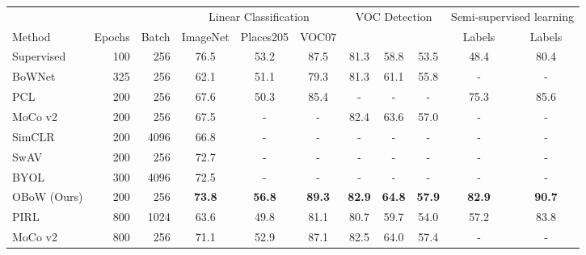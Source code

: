 \documentclass[final]{cvpr}
\begin{document}
\begin{table*}[t!]
\centering
\renewcommand{\figurename}{Table}
\renewcommand{\captionlabelfont}{\bf}
\renewcommand{\captionfont}{\small} 
{\setlength{\extrarowheight}{2pt}\small
{
\begin{tabular}{ l | r | r | c c c | c c c | c c }
\toprule
                            &    &    & \multicolumn{3}{c|}{Linear Classification} & \multicolumn{3}{c|}{VOC Detection} & \multicolumn{2}{c}{Semi-supervised learning}\\
\multicolumn{1}{l|}{Method} & Epochs & Batch & ImageNet &  Places205 & VOC07 & \multicolumn{1}{c}{} & \multicolumn{1}{c}{} & \multicolumn{1}{c|}{} & \multicolumn{1}{c}{ Labels} & \multicolumn{1}{c}{ Labels} \\
\midrule
Supervised                                                      &  100 & 256  & 76.5 & 53.2 & 87.5 & 81.3 & 58.8 & 53.5 & 48.4 & 80.4\\
\midrule
BoWNet~\cite{gidaris2020learning}                                &  325 & 256  & 62.1 & 51.1 & 79.3 & 81.3 & 61.1 & 55.8 & - & -\\
PCL~\cite{li2020prototypical}                                    &  200 & 256  & 67.6 & 50.3 & 85.4 & -    & -    & -       & 75.3 & 85.6\\
MoCo v2~\cite{he2020momentum}                                    &  200 & 256  & 67.5 & -    & -    & 82.4 & 63.6 & 57.0    & - & -\\
SimCLR~\cite{chen2020simple}                                     &  200 & 4096 & 66.8 & -    & -    &  -   & -    & -       & - & -\\
SwAV~\cite{caron2020unsupervised}                                &  200 &  256 & 72.7 & -  &  -   & -    & -       & - & - & -\\
BYOL~\cite{grill2020bootstrap}                                   &  300 & 4096 & 72.5 &  -   &  -   &  -   & -    & -       & - & -\\
\midrule
OBoW (Ours)                                                      & 200  & 256  & \textbf{73.8} & \textbf{56.8} & \textbf{89.3} & \textbf{82.9}  & \textbf{64.8} & \textbf{57.9} & \textbf{82.9} & \textbf{90.7}\\
\midrule
PIRL~\cite{misra2020self}                                        &  800 & 1024 & 63.6 & 49.8 & 81.1 & 80.7 & 59.7 & 54.0 & 57.2 & 83.8\\
MoCo v2~\cite{he2020momentum}                                    &  800 & 256  & 71.1 & 52.9 & 87.1 & 82.5 & 64.0 & 57.4 & - & -\\

\end{tabular}}}
\end{table*}
\end{document}
